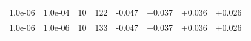 \documentclass[11pt,a4paper]{article}
\begin{document}
\begin{table}
\begin{tabular}{*{8}c}
 1.0e-06 	 & 1.0e-04 	 & 10 & 122 	 & -0.047 & +0.037 & +0.036 & +0.026 \\ 
 1.0e-06 	 & 1.0e-06 	 & 10 & 133 	 & -0.047 & +0.037 & +0.036 & +0.026 \\ 
% 

\end{tabular}
\end{table}
\end{document}
